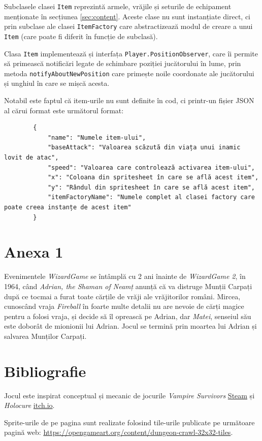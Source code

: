 \documentclass{article}
\begin{document}
    Subclasele clasei \texttt{Item} reprezintă armele, vrăjile și seturile de echipament menționate
    în secțiunea \ref{sec:content}. Aceste clase nu sunt instanțiate direct, ci prin subclase ale
    clasei \texttt{ItemFactory} care abstractizează modul de creare a unui \texttt{Item} (care
    poate fi diferit în funcție de subclasă).

    Clasa \texttt{Item} implementează și interfața \texttt{Player.PositionObserver}, care îi permite
    să primească notificări legate de schimbare poziției jucătorului în lume, prin metoda
    \texttt{notifyAboutNewPosition} care primește noile coordonate ale jucătorului și unghiul în
    care se mișcă acesta.

    Notabil este faptul că item-urile nu sunt definite în cod, ci printr-un fișier JSON al cărui
    format este următorul format:

    \begin{verbatim}
        {
            "name": "Numele item-ului",
            "baseAttack": "Valoarea scăzută din viața unui inamic lovit de atac",
            "speed": "Valoarea care controlează activarea item-ului",
            "x": "Coloana din spritesheet în care se află acest item",
            "y": "Rândul din spritesheet în care se află acest item",
            "itemFactoryName": "Numele complet al clasei factory care poate creea instanțe de acest item"
        }
    \end{verbatim}

    \section*{Anexa 1}
    \label{sec:anexa1}
    Evenimentele \emph{WizardGame} se întâmplă cu 2 ani înainte de \emph{WizardGame 2}, în 1964,
    când \emph{Adrian, the Shaman of Neamț} anunță că va distruge Munții Carpați după ce tocmai
    a furat toate cărțile de vrăji ale vrăjitorilor români. Mircea, cunoscând vraja \emph{Fireball}
    în foarte multe detalii nu are nevoie de cărți magice pentru a folosi vraja, și decide să îl
    oprească pe Adrian, dar \emph{Matei}, senseiul său este doborât de mionionii lui Adrian.
    Jocul se termină prin moartea lui Adrian și salvarea Munților Carpați.

    \section*{Bibliografie}
    Jocul este inspirat conceptual și mecanic de jocurile \emph{Vampire Survivors}
    \href{https://store.steampowered.com/app/1794680/Vampire_Survivors/}{Steam} și
    \emph{Holocure} \href{https://kay-yu.itch.io/holocure}{itch.io}.

    Sprite-urile de pe pagina \pageref{sec:sprites} sunt realizate folosind tile-urile publicate
    pe următoare pagină web: \url{https://opengameart.org/content/dungeon-crawl-32x32-tiles}.
\end{document}
